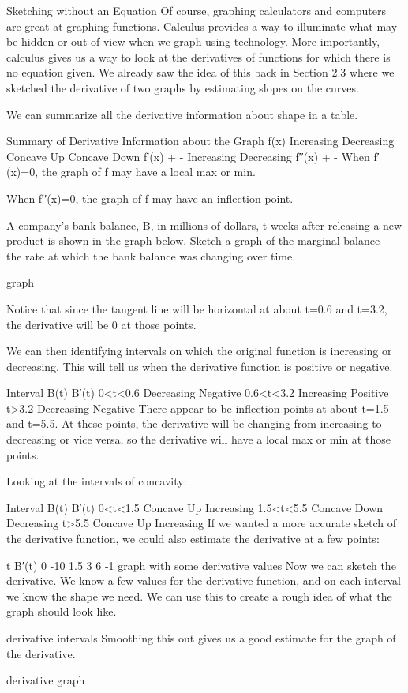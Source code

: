 Sketching without an Equation
Of course, graphing calculators and computers are great at graphing functions. Calculus provides a way to illuminate what may be hidden or out of view when we graph using technology. More importantly, calculus gives us a way to look at the derivatives of functions for which there is no equation given. We already saw the idea of this back in Section 2.3 where we sketched the derivative of two graphs by estimating slopes on the curves.

We can summarize all the derivative information about shape in a table.

Summary of Derivative Information about the Graph
f(x)	Increasing	Decreasing	Concave Up	Concave Down	f′(x)	+	-	Increasing	Decreasing	f′′(x)			+	-
When f′(x)=0, the graph of f may have a local max or min.

When f′′(x)=0, the graph of f may have an inflection point.

\begin{example}
A company's bank balance, B, in millions of dollars, t weeks after releasing a new product is shown in the graph below. Sketch a graph of the marginal balance – the rate at which the bank balance was changing over time.

graph
\begin{solution} Notice that since the tangent line will be horizontal at about t=0.6 and t=3.2, the derivative will be 0 at those points.

We can then identifying intervals on which the original function is increasing or decreasing. This will tell us when the derivative function is positive or negative.

Interval	B(t)	B′(t)	0<t<0.6	Decreasing	Negative	0.6<t<3.2	Increasing	Positive	t>3.2	Decreasing	Negative
There appear to be inflection points at about t=1.5 and t=5.5. At these points, the derivative will be changing from increasing to decreasing or vice versa, so the derivative will have a local max or min at those points.

Looking at the intervals of concavity:

Interval	B(t)	B′(t)	0<t<1.5	Concave Up	Increasing	1.5<t<5.5	Concave Down	Decreasing	t>5.5	Concave Up	Increasing
If we wanted a more accurate sketch of the derivative function, we could also estimate the derivative at a few points:

t	B′(t)	0	-10	1.5	3	6	-1 graph with some derivative values
Now we can sketch the derivative. We know a few values for the derivative function, and on each interval we know the shape we need. We can use this to create a rough idea of what the graph should look like.

derivative intervals
Smoothing this out gives us a good estimate for the graph of the derivative.

derivative graph
\end{solution}\end{example}
